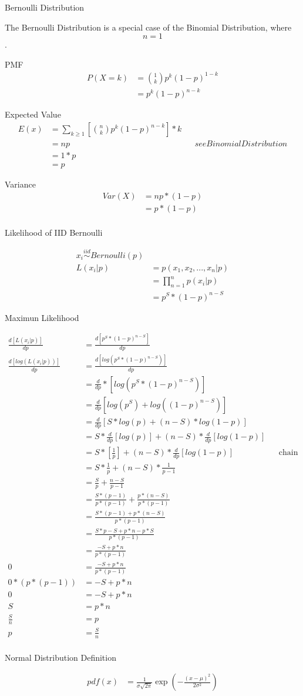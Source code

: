 \documentclass[]{article}
\begin{document}
Bernoulli Distribution

The Bernoulli Distribution is a special case of the Binomial Distribution, where $$n=1$$.

PMF
\begin{align}
P(X=k) &= \binom{1} {k} p^k (1-p)^{1-k}\\
&=p^k (1-p)^{n-k}
\end{align}

Expected Value
\begin{align}
	E(x) &= \sum_{k \geqslant 1} [\binom{n}{k} p^k (1-p)^{n-k}] * k\\
	&= np && see BinomialDistribution\\
	&= 1*p\\
	&= p
\end{align}

Variance
\begin{align}
	Var(X) &= np*(1-p)\\
	&= p*(1-p)\\
\end{align}

Likelihood of IID Bernoulli

\begin{align}
	x_i \overset{iid}{\sim} Bernoulli(p)\\
	L(x_i|p)&=p(x_1,x_2,...,x_n|p)\\&=\prod_{n=1}^np(x_i|p)\\
	&=p^S*(1-p)^{n-S}
 \end{align}
 
 Maximun Likelihood
 
 \begin{align}
	 \frac{d[L(x_i|p)]}{dp} &=\frac{d[p^S*(1-p)^{n-S}]}{dp}\\
	 \frac{d[log(L(x_i|p))]}{dp} &=\frac{d[log(p^S*(1-p)^{n-S})]}{dp}\\
	 &= \frac{d}{dp}*[log(p^S*(1-p)^{n-S})]\\
	 &= \frac{d}{dp}[log(p^S)+log((1-p)^{n-S})]\\
	 &= \frac{d}{dp}[S*log(p)+(n-S)*log(1-p)]\\
	 &= S*\frac{d}{dp}[log(p)]+(n-S)*\frac{d}{dp}[log(1-p)]\\
	 &= S*[\frac{1}{p}]+(n-S)*\frac{d}{dp}[log(1-p)] && \text{chain rule}\\
	 &= S*\frac{1}{p}+(n-S)*\frac{1}{p-1}\\
 	 &= \frac{S}{p}+\frac{n-S}{p-1}\\
 	 &= \frac{S*(p-1)}{p*(p-1)}+\frac{p*(n-S)}{p*(p-1)}\\
 	 &= \frac{S*(p-1)+p*(n-S)}{p*(p-1)}\\
 	 &= \frac{S*p-S+p*n-p*S}{p*(p-1)}\\
 	 &= \frac{-S+p*n}{p*(p-1)}\\
 	 0 &= \frac{-S+p*n}{p*(p-1)}\\
  	 0*(p*(p-1)) &= -S+p*n\\
  	 0 &= -S+p*n\\
 	 S &= p*n\\
 	 \frac{S}{n} &= p\\
  	 p &= \frac{S}{n}\\
 \end{align}

Normal Distribution
Definition

\begin{align}
pdf(x) &= \frac{1}{\sigma\sqrt{2\pi}}\exp\left(-\frac{(x-\mu)^2}{2\sigma^2}\right)
\end{align}
\end{document}
